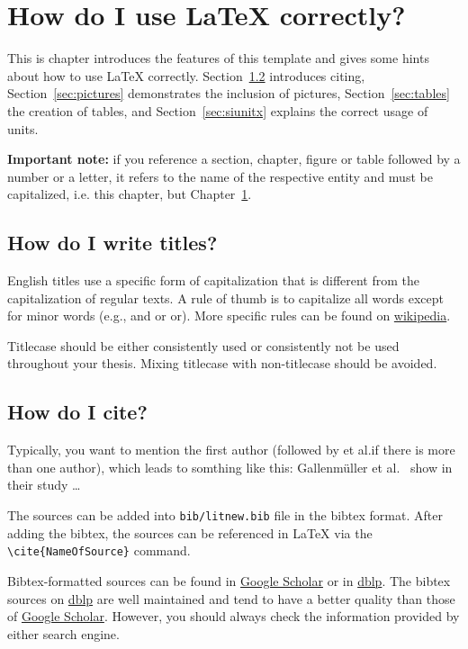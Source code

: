 \chapter{How do I use \LaTeX{} correctly?}
\label{chap:chapterone}

This is chapter introduces the features of this template and gives some hints about how to use \LaTeX{} correctly.
Section~\ref{sec:cite} introduces citing, Section~\ref{sec:pictures} demonstrates the inclusion of pictures, Section~\ref{sec:tables} the creation of tables, and Section~\ref{sec:siunitx} explains the correct usage of units.

\textbf{Important note:} if you reference a section, chapter, figure or table followed by a number or a letter, it refers to the name of the respective entity and must be capitalized, i.e. this chapter, but Chapter~\ref{chap:chapterone}.

\section{How do I write titles?}

English titles use a specific form of capitalization that is different from the capitalization of regular texts.
A rule of thumb is to capitalize all words except for minor words (e.g., and or or).
More specific rules can be found on \textcolor{TUMBlue}{\href{https://en.wikipedia.org/wiki/Title\_case}{wikipedia}}.

Titlecase should be either consistently used or consistently not be used throughout your thesis.
Mixing titlecase with non-titlecase should be avoided.

\section{How do I cite?}
\label{sec:cite}

Typically, you want to mention the first author (followed by et al.\@ if there is more than one author), which leads to somthing like this: Gallenmüller et al.~\cite{DBLP:journals/cm/GallenmullerNAC20} show in their study \ldots

The sources can be added into \texttt{bib/litnew.bib} file in the bibtex format.
After adding the bibtex, the sources can be referenced in \LaTeX{} via the \texttt{\textbackslash cite\{NameOfSource\}} command.

Bibtex-formatted sources can be found in \textcolor{TUMBlue}{\href{https://scholar.google.com/}{Google Scholar}} or in \textcolor{TUMBlue}{\href{https://dblp.org/}{dblp}}.
The bibtex sources on \textcolor{TUMBlue}{\href{https://dblp.org/}{dblp}} are well maintained and tend to have a better quality than those of \textcolor{TUMBlue}{\href{https://scholar.google.com/}{Google Scholar}}.
However, you should always check the information provided by either search engine.

